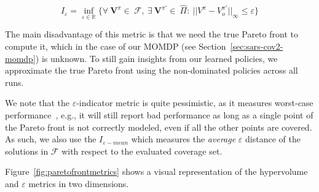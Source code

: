 \documentclass{article}
\renewcommand{\cite}[1]{\citep{#1}}
\newcommand{\mdpvaluefunction}{V}
\newcommand{\momdpvaluefunction}{\mathbf{V}}
\begin{document}
\begin{equation}
\label{eq:epsilon-metric}
    I_{\varepsilon} = 
    \inf_{\varepsilon\in\mathbb{R}} 
    \{ 
    \forall\ \momdpvaluefunction^\pi\!{\in}\ \mathcal{F}, ~
    \exists\ \momdpvaluefunction^{\pi'}\!{\in}\ \hat{\Pi} :\ 
    || \mdpvaluefunction^\pi - \mdpvaluefunction_o^{\pi'} ||_{\infty} \le \varepsilon
    \}
\end{equation}

The main disadvantage of this metric is that we need the true Pareto front to compute it, which in the case of our MOMDP (see Section~\ref{sec:sars-cov2-momdp}) is unknown. To still gain insights from our learned policies, we approximate the true Pareto front using the non-dominated policies across all runs.

We note that the $\varepsilon$-indicator metric is quite pessimistic, as it measures worst-case performance~\cite{zintgraf2015}, e.g., it will still report bad performance as long as a single point of the Pareto front is not correctly modeled, even if all the other points are covered. As such, we also use the $I_{\varepsilon-mean}$ \cite{reymond2022pcn} which measures the \emph{average} $\varepsilon$ distance of the solutions in $\mathcal{F}$ with respect to the evaluated coverage set.

Figure~\ref{fig:paretofrontmetrics} shows a visual representation of the hypervolume and $\varepsilon$ metrics in two dimensions.
\end{document}
